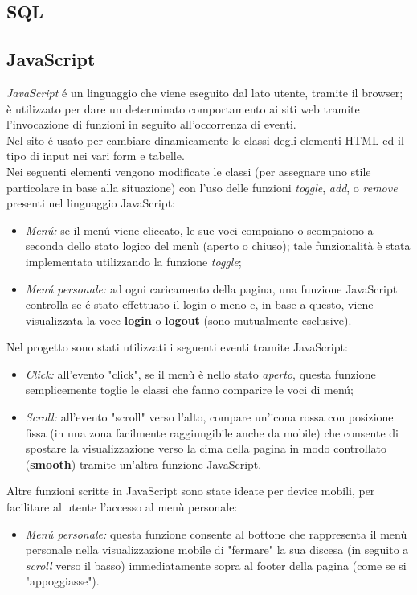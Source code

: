 \documentclass[]{article}
\begin{document}
\subsection{SQL}	%
\subsection{JavaScript} %
\textit{JavaScript} é un linguaggio che viene eseguito dal lato utente, tramite il browser; è utilizzato per dare un determinato comportamento ai siti web tramite l'invocazione di funzioni in seguito all'occorrenza di eventi.\\
Nel sito é usato per cambiare dinamicamente le classi degli elementi HTML ed il tipo di input nei vari form e tabelle.\\
Nei seguenti elementi vengono modificate le classi (per assegnare uno stile particolare in base alla situazione) con l'uso delle funzioni \textit{toggle}, \textit{add}, o \textit{remove} presenti nel linguaggio JavaScript:
\begin{itemize}
        \item \textit{Menú:} se il menú viene cliccato, le sue voci compaiano o scompaiono a seconda dello stato logico del menù (aperto o chiuso); tale funzionalità è stata implementata utilizzando la funzione \textit{toggle};
        \item \textit{Menú personale:} ad ogni caricamento della pagina, una funzione JavaScript controlla se é stato effettuato il login o meno e, in base a questo, viene visualizzata la voce \textbf{login} o \textbf{logout} (sono mutualmente esclusive).
\end{itemize}
Nel progetto sono stati utilizzati i seguenti eventi tramite JavaScript:
\begin{itemize}
        \item \textit{Click:} all'evento "click", se il menù è nello stato \textit{aperto}, questa funzione semplicemente toglie le classi che fanno comparire le voci di menú;
        \item \textit{Scroll:} all'evento "scroll" verso l'alto, compare un'icona rossa con posizione fissa (in una zona facilmente raggiungibile anche da mobile) che consente di spostare la visualizzazione verso la cima della pagina in modo controllato (\textbf{smooth}) tramite un'altra funzione JavaScript.
\end{itemize}
Altre funzioni scritte in JavaScript sono state ideate per device mobili, per facilitare al utente l'accesso al menù personale:
\begin{itemize}
        \item \textit{Menú personale:} questa funzione consente al bottone che rappresenta il menù personale nella visualizzazione mobile di "fermare" la sua discesa (in seguito a \textit{scroll} verso il basso) immediatamente sopra al footer della pagina (come se si "appoggiasse").
\end{itemize}
\end{document}
